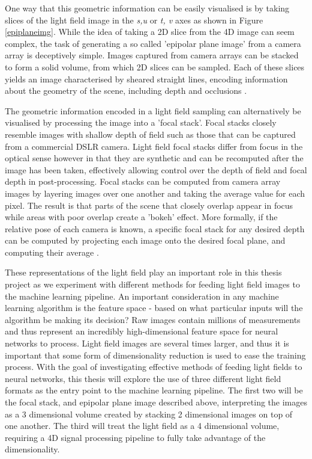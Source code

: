 \documentclass[openany]{book}
\begin{document}
One way that this geometric information can be easily visualised is by taking slices of the light field image in the \textit{s,u} or \textit{t, v} axes as shown in Figure \ref{epiplaneimg}. While the idea of taking a 2D slice from the 4D image can seem complex, the task of generating a so called 'epipolar plane image' from a camera array is deceptively simple. Images captured from camera arrays can be stacked to form a solid volume, from which 2D slices can be sampled. Each of these slices yields an image characterised by sheared straight lines, encoding information about the geometry of the scene, including depth and occlusions \cite{bolles1987epiplane}. 

The geometric information encoded in a light field sampling can alternatively be visualised by processing the image into a 'focal stack'. Focal stacks closely resemble images with shallow depth of field such as those that can be captured from a commercial DSLR camera. Light field focal stacks differ from focus in the optical sense however in that they are synthetic and can be recomputed after the image has been taken, effectively allowing control over the depth of field and focal depth in post-processing. Focal stacks can be computed from camera array images by layering images over one another and taking the average value for each pixel. The result is that parts of the scene that closely overlap appear in focus while areas with poor overlap create a 'bokeh' effect. More formally, if the relative pose of each camera is known, a specific focal stack for any desired depth can be computed by projecting each image onto the desired focal plane, and computing their average \cite{vaish2004parallax}.

These representations of the light field play an important role in this thesis project as we experiment with different methods for feeding light field images to the machine learning pipeline. An important consideration in any machine learning algorithm is the feature space - based on what particular inputs will the algorithm be making its decision? Raw images contain millions of measurements and thus represent an incredibly high-dimensional feature space for neural networks to process. Light field images are several times larger, and thus it is important that some form of dimensionality reduction is used to ease the training process. With the goal of investigating effective methods of feeding light fields to neural networks, this thesis will explore the use of three different light field formats as the entry point to the machine learning pipeline. The first two will be the focal stack, and epipolar plane image described above, interpreting the images as a 3 dimensional volume created by stacking 2 dimensional images on top of one another. The third will treat the light field as a 4 dimensional volume, requiring a 4D signal processing pipeline to fully take advantage of the dimensionality.
\end{document}
